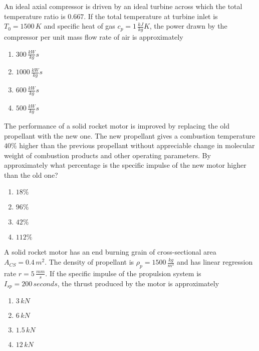     \item An ideal axial compressor is driven by an ideal turbine across which the total temperature ratio is $0.667$. If the total temperature at turbine inlet is $T_0=1500\,K$ and specific heat of gas $c_p=1\,\frac{kJ}{kg}K$, the power drawn by the compressor per unit mass flow rate of air is approximately
    \begin{enumerate}
        \item $300\, \frac{kW}{kg}s$
        \item $1000\,\frac{kW}{kg}s$
        \item $600\,\frac{kW}{kg}s$
        \item $500\,\frac{kW}{kg}s$
    \end{enumerate}
    \item The performance of a solid rocket motor is improved by replacing the old propellant with the new one. The new propellant gives a combustion temperature $40\%$ higher than the previous propellant without appreciable change in molecular weight of combustion products and other operating parameters. By approximately what percentage is the specific impulse of the new motor higher than the old one?
    \begin{enumerate}
        \item $18\%$
        \item $96\%$
        \item $42\%$
        \item $112\%$
    \end{enumerate}
    \item A solid rocket motor has an end burning grain of cross-sectional area $A_{CS}=0.4\,m^2$. The density of propellant is $\rho_p=1500\,\frac{kg}{m^3}$ and has linear regression rate $r=5\,\frac{mm}{s}$. If the specific impulse of the propulsion system is $I_{sp}=200\,seconds$, the thrust  produced by the motor is approximately
    \begin{enumerate}
        \item $3\,kN$
        \item $6\,kN$
        \item $1.5\,kN$
        \item $12\,kN$
    \end{enumerate}
